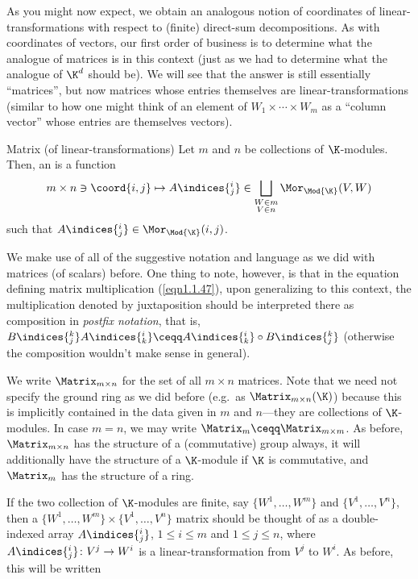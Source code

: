As you might now expect, we obtain an analogous notion of coordinates of linear-transformations with respect to (finite) direct-sum decompositions.  As with coordinates of vectors, our first order of business is to determine what the analogue of matrices is in this context (just as we had to determine what the analogue of $\K ^d$ should be).  We will see that the answer is still essentially ``matrices'', but now matrices whose entries themselves are linear-transformations (similar to how one might think of an element of $W_1\times \cdots \times W_m$ as a ``column vector'' whose entries are themselves vectors).
\begin{dfn}{Matrix (of linear-transformations)}{}
	Let $m$ and $n$ be collections of $\K$-modules.  Then, an  is a function
	\begin{equation}
		m\times n\ni \coord{i,j}\mapsto A\indices{^i_j}\in \bigsqcup _{\substack{W\in m \\ V\in n}}\Mor _{\Mod{\K}}(V,W)
	\end{equation}
	such that $A\indices{^i_j}\in \Mor _{\Mod{\K}}(i,j)$.
	\begin{rmk}
		We make use of all of the suggestive notation and language as we did with matrices (of scalars) before.  One thing to note, however, is that in the equation defining matrix multiplication (\eqref{eqn1.1.47}), upon generalizing to this context, the multiplication denoted by juxtaposition should be interpreted there as composition in \emph{postfix notation}, that is, $B\indices{^k_j}A\indices{^i_k}\ceqq A\indices{^i_k}\circ B\indices{^k_j}$ (otherwise the composition wouldn't make sense in general).
	\end{rmk}
	\begin{rmk}
		We write $\Matrix _{m\times n}$ for the set of all $m\times n$ matrices.  Note that we need not specify the ground ring as we did before (e.g.~as $\Matrix _{m\times n}(\K )$) because this is implicitly contained in the data given in $m$ and $n$---they are collections of \emph{$\K$}-modules.  In case $m=n$, we may write $\Matrix _m\ceqq \Matrix _{m\times m}$.  As before, $\Matrix _{m\times n}$ has the structure of a (commutative) group always, it will additionally have the structure of a $\K$-module if $\K$ is commutative, and $\Matrix _m$ has the structure of a ring.
	\end{rmk}
	\begin{rmk}
		If the two collection of $\K$-modules are finite, say $\{ W^1,\ldots ,W^m\}$ and $\{ V^1,\ldots ,V^n\}$, then a $\{ W^1,\ldots ,W^m\} \times \{ V^1,\ldots ,V^n\}$ matrix should be thought of as a double-indexed array $A\indices{^i_j}$, $1\leq i\leq m$ and $1\leq j\leq n$, where $A\indices{^i_j}\colon V^j\rightarrow W^i$ is a linear-transformation from $V^j$ to $W^i$.  As before, this will be written

\end{rmk}
\end{dfn}
